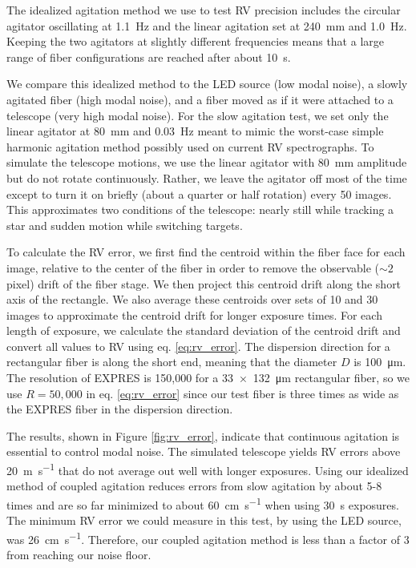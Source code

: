 \documentclass[twocolumn]{emulateapj}
\begin{document}
The idealized agitation method we use to test RV precision includes the circular agitator oscillating at \SI{1.1}{\hertz} and the linear agitation set at \SI{240}{\milli\meter} and \SI{1.0}{\hertz}. Keeping the two agitators at slightly different frequencies means that a large range of fiber configurations are reached after about \SI{10}{\second}.

We compare this idealized method to the LED source (low modal noise), a slowly agitated fiber (high modal noise), and a fiber moved as if it were attached to a telescope (very high modal noise). For the slow agitation test, we set only the linear agitator at \SI{80}{\milli\meter} and \SI{0.03}{\hertz} meant to mimic the worst-case simple harmonic agitation method possibly used on current RV spectrographs. To simulate the telescope motions, we use the linear agitator with \SI{80}{\milli\meter} amplitude but do not rotate continuously. Rather, we leave the agitator off most of the time except to turn it on briefly (about a quarter or half rotation) every 50 images. This approximates two conditions of the telescope: nearly still while tracking a star and sudden motion while switching targets.

To calculate the RV error, we first find the centroid within the fiber face for each image, relative to the center of the fiber in order to remove the observable ($\sim 2$ pixel) drift of the fiber stage. We then project this centroid drift along the short axis of the rectangle. We also average these centroids over sets of 10 and 30 images to approximate the centroid drift for longer exposure times. For each length of exposure, we calculate the standard deviation of the centroid drift and convert all values to RV using eq. \ref{eq:rv_error}. The dispersion direction for a rectangular fiber is along the short end, meaning that the diameter $D$ is \SI{100}{\micro\meter}. The resolution of EXPRES is 150,000 for a \SI{33x132}{\micro\meter} rectangular fiber, so we use $R=50,000$ in eq. \ref{eq:rv_error} since our test fiber is three times as wide as the EXPRES fiber in the dispersion direction.

The results, shown in Figure \ref{fig:rv_error}, indicate that continuous agitation is essential to control modal noise. The simulated telescope yields RV errors above \SI{20}{\meter\per\second} that do not average out well with longer exposures. Using our idealized method of coupled agitation reduces errors from slow agitation by about 5-8 times and are so far minimized to about \SI{60}{\centi\meter\per\second} when using \SI{30}{\second} exposures. The minimum RV error we could measure in this test, by using the LED source, was \SI{26}{\centi\meter\per\second}. Therefore, our coupled agitation method is less than a factor of 3 from reaching our noise floor.
\end{document}
